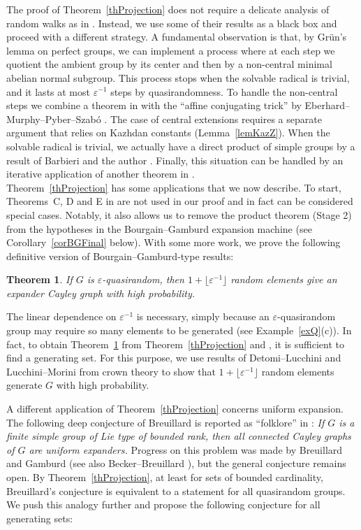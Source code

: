 \documentclass[11pt,reqno]{amsart}
\numberwithin{equation}{section}
\newtheorem{theorem}{Theorem}[section]
\theoremstyle{definition}
\theoremstyle{remark}
\begin{document}
The proof of Theorem~\ref{thProjection} does not require a delicate analysis of random walks as in \cite{GS24,GS25}.
Instead, we use some of their results as a black box and proceed with a different strategy.
A fundamental observation is that, by Gr\"un's lemma on perfect groups,
we can implement a process where at each step we quotient the ambient group by its center
and then by a non-central minimal abelian normal subgroup.
This process stops when the solvable radical is trivial,
and it lasts at most $\varepsilon^{-1}$ steps by quasirandomness.
To handle the non-central steps we combine a theorem in \cite{GS25} with
the ``affine conjugating trick'' by Eberhard--Murphy--Pyber--Szab\'o \cite{EMPS25}.
The case of central extensions requires a separate argument that relies on Kazhdan constants
(Lemma~\ref{lemKazZ}).
When the solvable radical is trivial, we actually have a direct product of simple groups by a result
of Barbieri and the author \cite{BS25}.
Finally, this situation can be handled by an iterative application of another theorem in \cite{GS25}.\\

Theorem~\ref{thProjection} has some applications that we now describe.
To start, Theorems~C, D and E in \cite{GS25} are not used in our proof
and in fact can be considered special cases.
Notably, it also allows us to remove the product theorem (Stage 2)
from the hypotheses in the Bourgain--Gamburd expansion machine \cite[Theorem~1.4.2]{Tao15}
(see Corollary~\ref{corBGFinal} below).
With some more work, we prove the following definitive version of Bourgain--Gamburd-type results:

\begin{theorem} \label{thExpRan}
If $G$ is $\varepsilon$-quasirandom,
 then $1 + \lfloor \varepsilon^{-1} \rfloor$ random elements give an expander Cayley graph with high probability.
 \end{theorem}
 
The linear dependence on $\varepsilon^{-1}$ is necessary,
simply because an $\varepsilon$-quasirandom group
may require so many elements to be generated (see Example~\ref{exQ}(c)).
In fact, to obtain Theorem~\ref{thExpRan} from Theorem~\ref{thProjection} and \cite{BGGT15},
it is sufficient to find a generating set.
For this purpose,
we use results of Detomi--Lucchini \cite{DL03} and Lucchini--Morini \cite{LM02} from crown theory
to show that $1 + \lfloor \varepsilon^{-1} \rfloor$ random elements generate $G$ with high probability.

A different application of Theorem~\ref{thProjection} concerns uniform expansion.
The following deep conjecture of Breuillard is reported as ``folklore'' in \cite[Conjecture~4.12]{Bre14}:
\emph{If $G$ is a finite simple group of Lie type of bounded rank,
then all connected Cayley graphs of $G$ are uniform expanders.}
Progress on this problem was made by Breuillard and Gamburd \cite{BG10}
(see also Becker--Breuillard \cite{BB26}), but the general conjecture remains open.
By Theorem~\ref{thProjection}, at least for sets of bounded cardinality,
Breuillard's conjecture is equivalent to a statement for all quasirandom groups.
We push this analogy further and propose the following conjecture for all generating sets:
\end{document}
